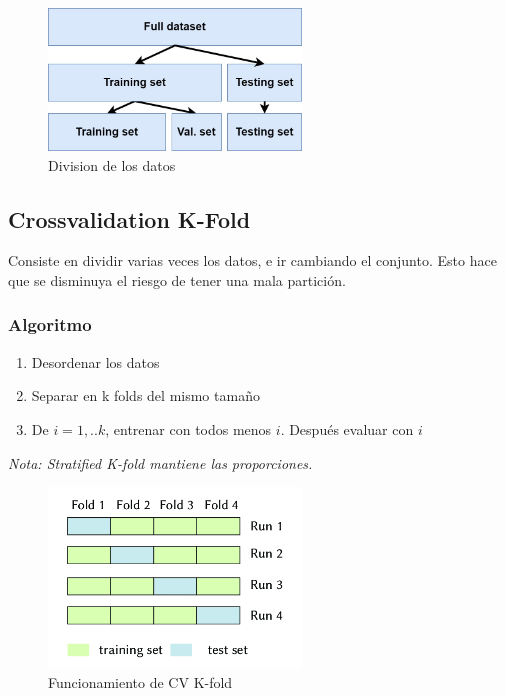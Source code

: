 \documentclass[titlepage,a4paper]{article}
\begin{document}
\begin{figure}[!htb]
    \centering
    \includegraphics[width=0.6\textwidth]{imagenesResumen/TrainTestSplit.jpg}
    \caption{Division de los datos}
\end{figure}

\subsection{Crossvalidation K-Fold}

Consiste en dividir varias veces los datos, e ir cambiando el conjunto. Esto hace que se disminuya el riesgo de tener una mala partición.

\subsubsection*{Algoritmo}
\begin{enumerate}
    \item Desordenar los datos
    \item Separar en k folds del mismo tamaño
    \item De $i = 1,..k$, entrenar con todos menos $i$. Después evaluar con $i$  
\end{enumerate}

\textit{Nota: Stratified K-fold mantiene las proporciones.}

\begin{figure}[!htb]
    \centering
    \includegraphics[width=0.6\textwidth]{imagenesResumen/CVKFold.png}
    \caption{Funcionamiento de CV K-fold}
\end{figure}
\end{document}
